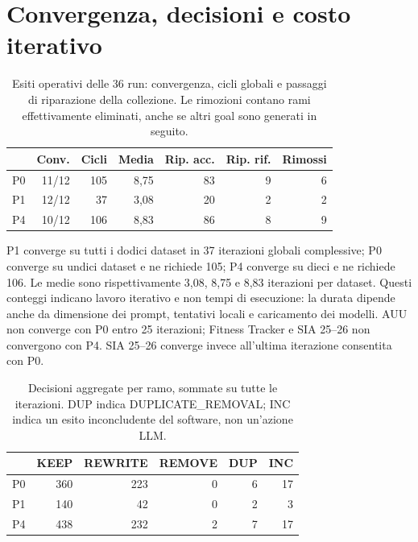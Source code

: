 \section{Convergenza, decisioni e costo iterativo}
\begin{table}[htbp]
\centering
\small
\caption{Esiti operativi delle 36 run: convergenza, cicli globali e passaggi di riparazione della collezione. Le rimozioni contano rami effettivamente eliminati, anche se altri goal sono generati in seguito.}
\label{tab:results-convergence}
\begin{tabular}{lrrrrrr}
\toprule
 & \textbf{Conv.} & \textbf{Cicli} & \textbf{Media} & \textbf{Rip. acc.} & \textbf{Rip. rif.} & \textbf{Rimossi} \\
\midrule
P0 & 11/12 & 105 & 8,75 & 83 & 9 & 6 \\
P1 & 12/12 & 37 & 3,08 & 20 & 2 & 2 \\
P4 & 10/12 & 106 & 8,83 & 86 & 8 & 9 \\
\bottomrule
\end{tabular}
\end{table}


P1 converge su tutti i dodici dataset in 37 iterazioni globali
complessive; P0 converge su undici dataset e ne richiede 105; P4
converge su dieci e ne richiede 106. Le medie sono rispettivamente
3,08, 8,75 e 8,83 iterazioni per dataset. Questi conteggi indicano
lavoro iterativo e non tempi di esecuzione: la durata dipende anche
da dimensione dei prompt, tentativi locali e caricamento dei modelli.
AUU non converge con P0 entro 25 iterazioni; Fitness Tracker e
SIA 25--26 non convergono con P4. SIA 25--26 converge invece
all'ultima iterazione consentita con P0.

\begin{table}[htbp]
\centering
\small
\caption{Decisioni aggregate per ramo, sommate su tutte le iterazioni. DUP indica DUPLICATE\_REMOVAL; INC indica un esito inconcludente del software, non un'azione LLM.}
\label{tab:results-actions}
\begin{tabular}{lrrrrr}
\toprule
 & \textbf{KEEP} & \textbf{REWRITE} & \textbf{REMOVE} & \textbf{DUP} & \textbf{INC} \\
\midrule
P0 & 360 & 223 & 0 & 6 & 17 \\
P1 & 140 & 42 & 0 & 2 & 3 \\
P4 & 438 & 232 & 2 & 7 & 17 \\
\bottomrule
\end{tabular}
\end{table}


